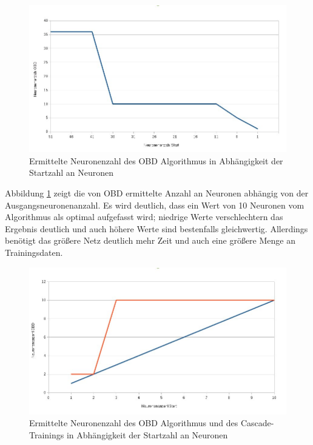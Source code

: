 \begin{figure}[!h]
	\centering
	\includegraphics[scale=0.5]{images/nn/a1.jpg} 
	\caption{Ermittelte Neuronenzahl des OBD Algorithmus in Abhängigkeit der Startzahl an Neuronen}
	\label{nnchrisa1}
\end{figure}

Abbildung \ref{nnchrisa1} zeigt die von OBD ermittelte Anzahl an Neuronen abhängig von der Ausgangsneuronenanzahl. Es wird deutlich, dass ein Wert von 10 Neuronen vom Algorithmus als optimal aufgefasst wird; niedrige Werte verschlechtern das Ergebnis deutlich und auch höhere Werte sind bestenfalls gleichwertig. Allerdings benötigt das größere Netz deutlich mehr Zeit und auch eine größere Menge an Trainingsdaten.\\

\begin{figure}[!h]
	\centering
	\includegraphics[scale=0.5]{images/nn/a2.jpg} 
	\caption{Ermittelte Neuronenzahl des OBD Algorithmus und des Cascade-Trainings in Abhängigkeit der Startzahl an Neuronen}
	\label{nnchrisa2}
\end{figure}

